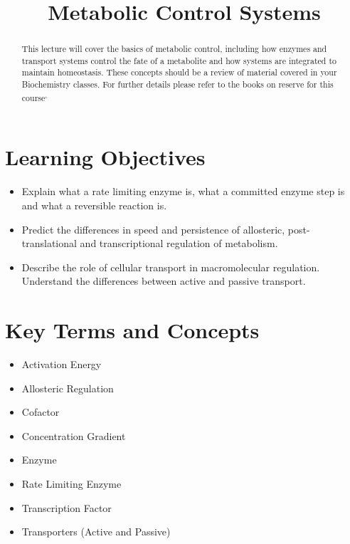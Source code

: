 \documentclass{tufte-handout}
\title{Metabolic Control Systems}
\author{}
\date{}  %
\begin{document}
\maketitle%

\begin{abstract}
\noindent This lecture will cover the basics of metabolic control, including how enzymes and transport systems control the fate of a metabolite and how systems are integrated to maintain homeostasis.  These concepts should be a review of material covered in your Biochemistry classes.  For further details please refer to the books on reserve for this course\cite{Berg2013}\textsuperscript{,}\cite{Ferrier2017}
\end{abstract}

\tableofcontents

\pagebreak
\section{Learning Objectives}

\begin{itemize}
\item Explain what a rate limiting enzyme is, what a committed enzyme step is and what a reversible reaction is.
\item Predict the differences in speed and persistence of allosteric, post-translational and transcriptional regulation of metabolism.
\item Describe the role of cellular transport in macromolecular regulation. Understand the differences between active and passive transport.

\end{itemize}

\section{Key Terms and Concepts}

\begin{itemize}
\item Activation Energy
\item Allosteric Regulation
\item Cofactor
\item Concentration Gradient
\item Enzyme
\item Rate Limiting Enzyme
\item Transcription Factor
\item Transporters (Active and Passive)
\end{itemize}
\end{document}
